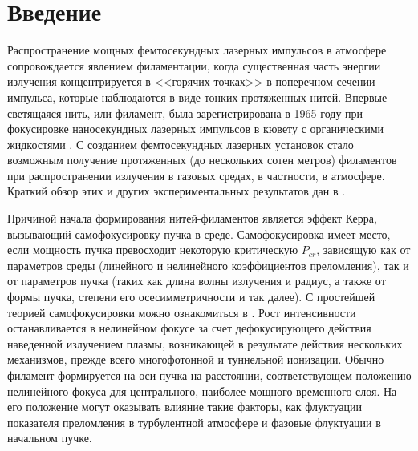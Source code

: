 \section{Введение}


Распространение мощных фемтосекундных лазерных импульсов в атмосфере сопровождается явлением филаментации, когда существенная часть энергии излучения концентрируется в <<горячих точках>> в поперечном сечении импульса, которые наблюдаются в виде тонких протяженных нитей.
Впервые светящаяся нить, или филамент, была зарегистрирована в 1965 году при фокусировке наносекундных лазерных импульсов в кювету с органическими жидкостями \cite{FirstFilament}.
С созданием фемтосекундных лазерных установок стало возможным получение протяженных (до нескольких сотен метров) филаментов при распространении излучения в газовых средах, в частности, в атмосфере.
Краткий обзор этих и других экспериментальных результатов дан в \cite{KandidovShlenovKosarevaReview2009}.

Причиной начала формирования нитей-филаментов является эффект Керра, вызывающий самофокусировку пучка в среде.
Самофокусировка имеет место, если мощность пучка превосходит некоторую критическую $P_{cr}$, зависящую как от параметров среды (линейного и нелинейного коэффициентов преломления), так и от параметров пучка (таких как длина волны излучения и радиус, а также от формы пучка, степени его осесимметричности и так далее).
С простейшей теорией самофокусировки можно ознакомиться в \cite{AkhmanovNikitin}.
Рост интенсивности останавливается в нелинейном фокусе за счет дефокусирующего действия наведенной излучением плазмы, возникающей в результате действия нескольких механизмов, прежде всего многофотонной и туннельной ионизации.
Обычно филамент формируется на оси пучка на расстоянии, соответствующем положению нелинейного фокуса для центрального, наиболее мощного временного слоя.
На его положение могут оказывать влияние такие факторы, как флуктуации показателя преломления в турбулентной атмосфере и фазовые флуктуации в начальном пучке.

